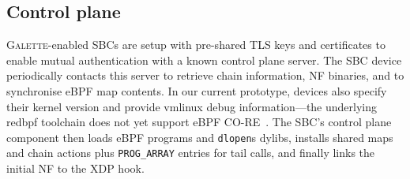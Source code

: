 \documentclass[comsoc, conference, times]{IEEEtran}
\newcommand{\ourtech}{\textsc{Galette}}
\begin{document}






\subsection{Control plane}\label{sec:ctl-plane}
\ourtech-enabled SBCs are setup with pre-shared TLS keys and certificates to enable mutual authentication with a known control plane server.
The SBC device periodically contacts this server to retrieve chain information, NF binaries, and to synchronise eBPF map contents.
In our current prototype, devices also specify their kernel version and provide vmlinux debug information---the underlying redbpf toolchain does not yet support eBPF CO-RE~\parencite{bpf-core}.
The SBC's control plane component then loads eBPF programs and \texttt{dlopen}s dylibs, installs shared maps and chain actions plus \texttt{PROG\_ARRAY} entries for tail calls, and finally links the initial NF to the XDP hook.

%
%

\end{document}
